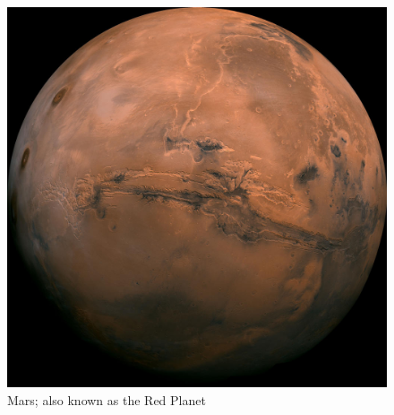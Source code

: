 \begin{figure}[h]
    \centering
    \includegraphics[width=.5\linewidth]{figures/marsImage01.jpg}
    \caption{Mars; also known as the Red Planet\cite{MarsPicture01}}
    \label{fig:marsPicture01}
\end{figure}




